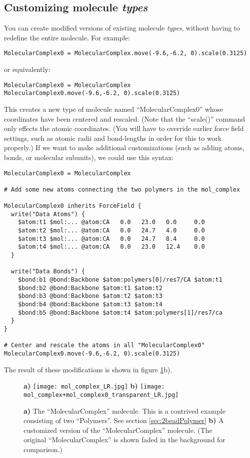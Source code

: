 \documentclass[11pt]{article}
\begin{document}
\subsection{Customizing molecule \textit{types}}
\label{sec:molecule_customization}
You can create modified versions of existing molecule \textit{types}, 
without having to redefine the entire molecule. For example:
\begin{verbatim}
MolecularComplex0 = MolecularComplex.move(-9.6,-6.2, 0).scale(0.3125)
\end{verbatim}
or equivalently:
\begin{verbatim}
MolecularComplex0 = MolecularComplex
MolecularComplex0.move(-9.6,-6.2, 0).scale(0.3125)
\end{verbatim}
This creates a new type of molecule named ``MolecularComplex0'' whose 
coordinates have been centered and rescaled.
(Note that the ``scale()'' command only effects the atomic coordinates.
(You will have to override earlier force field settings,
such as atomic radii and bond-lengths in order for this to work properly.)
If we want to make additional customizations
(such as adding atoms, bonds, or molecular subunits), we could use this syntax:
\begin{verbatim}
MolecularComplex0 = MolecularComplex

# Add some new atoms connecting the two polymers in the mol_complex

MolecularComplex0 inherits ForceField {
  write("Data Atoms") {
    $atom:t1 $mol:... @atom:CA   0.0   23.0   0.0     0.0
    $atom:t2 $mol:... @atom:CA   0.0   24.7   4.0     0.0
    $atom:t3 $mol:... @atom:CA   0.0   24.7   8.4     0.0
    $atom:t4 $mol:... @atom:CA   0.0   23.0   12.4    0.0
  }

  write("Data Bonds") {
    $bond:b1 @bond:Backbone $atom:polymers[0]/res7/CA $atom:t1
    $bond:b2 @bond:Backbone $atom:t1 $atom:t2
    $bond:b3 @bond:Backbone $atom:t2 $atom:t3
    $bond:b4 @bond:Backbone $atom:t3 $atom:t4
    $bond:b5 @bond:Backbone $atom:t4 $atom:polymers[1]/res7/ca
  }
}

# Center and rescale the atoms in all "MolecularComplex0"
MolecularComplex0.move(-9.6,-6.2, 0).scale(0.3125)
\end{verbatim}

The result of these modifications is shown in figure \ref{fig:mol_complex}b).
\begin{figure}[htbp]
\centering
\textbf{a)}
\texttt{[image: mol\_complex\_LR.jpg]}
\hspace{1cm}
\textbf{b)}
\texttt{[image: mol\_complex+mol\_complex0\_transparent\_LR.jpg]}
\caption{
\label{fig:mol_complex}
\textbf{a)}
The ``MolecularComplex'' molecule.  This is a contrived example consisting of
two ``Polymers''.  See section \ref{sec:2beadPolymer}
\textbf{b)}
A customized version of the ``MolecularComplex'' molecule.  
(The original ``MolecularComplex'' is shown faded in the background for comparison.)
}
\end{figure}
\end{document}
